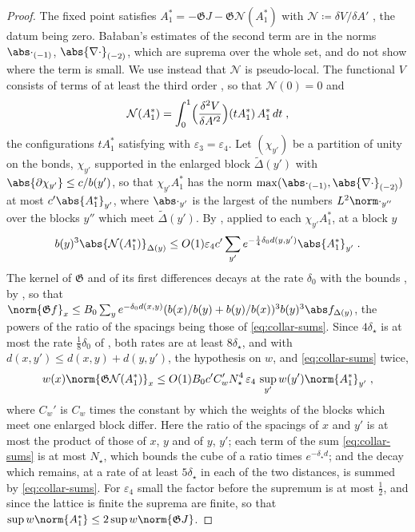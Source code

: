\begin{proof}
The fixed point satisfies $A_1^* = -\mathfrak GJ - \mathfrak G\mathcal N(A_1^*)$ with $\mathcal N \coloneqq \delta V/\delta A'$ \cite[(111)]{BalabanVAR}, the datum being zero. Ba{\l}aban's estimates of the second term \cite[(117), (120)]{BalabanVAR} are in the norms $\abs\cdot_{(-1)}$, $\abs{\nabla\cdot}_{(-2)}$, which are suprema over the whole set, and do not show where the term is small. We use instead that $\mathcal N$ is pseudo-local. The functional $V$ consists of terms of at least the third order \cite[(80)]{BalabanVAR}, so that $\mathcal N(0) = 0$ and
\[
    \mathcal N(A_1^*) = \int_0^1\Bigl(\frac{\delta^2V}{\delta A'^2}\Bigr)(tA_1^*)\,A_1^*\,dt\;,
\]
the configurations $tA_1^*$ satisfying \cite[(77)]{BalabanVAR} with $\varepsilon_3 = \varepsilon_4$. Let $(\chi_{y'})$ be a partition of unity on the bonds, $\chi_{y'}$ supported in the enlarged block $\tilde\Delta(y')$ with $\abs{\partial\chi_{y'}} \leq c/b(y')$, so that $\chi_{y'}A_1^*$ has the norm $\max(\abs\cdot_{(-1)}, \abs{\nabla\cdot}_{(-2)})$ at most $c'\abs{A_1^*}_{y'}$, where $\abs\cdot_{y'}$ is the largest of the numbers $L^2\norm\cdot_{y''}$ over the blocks $y''$ which meet $\tilde\Delta(y')$. By \cite[(189), p.~308]{BalabanVAR}, applied to each $\chi_{y'}A_1^*$, at a block $y$
\[
    b(y)^3\abs{\mathcal N(A_1^*)}_{\Delta(y)} \leq O(1)\varepsilon_4c'\sum_{y'}e^{-\frac{1}{4}\delta_0d(y,y')}\abs{A_1^*}_{y'}\;.
\]
The kernel of $\mathfrak G$ and of its first differences decays at the rate $\delta_0$ with the bounds \cite[(3.42)--(3.44)]{BalabanPBG}, by \cite[Theorem~3.13]{BalabanPBG}, so that $\norm{\mathfrak Gf}_x \leq B_0\sum_ye^{-\delta_0d(x,y)}(b(x)/b(y) + b(y)/b(x))^3b(y)^3\abs f_{\Delta(y)}$, the powers of the ratio of the spacings being those of \eqref{eq:collar-sums}. Since $4\delta_\star$ is at most the rate $\frac{1}{8}\delta_0$ of \cite[(190)]{BalabanVAR}, both rates are at least $8\delta_\star$, and with $d(x, y') \leq d(x, y) + d(y, y')$, the hypothesis on $w$, and \eqref{eq:collar-sums} twice,
\[
    w(x)\norm{\mathfrak G\mathcal N(A_1^*)}_x \leq O(1)B_0c'C_w'N_\star^4\,\varepsilon_4\,\sup_{y'}w(y')\norm{A_1^*}_{y'}\;,
\]
where $C_w'$ is $C_w$ times the constant by which the weights of the blocks which meet one enlarged block differ. Here the ratio of the spacings of $x$ and $y'$ is at most the product of those of $x$, $y$ and of $y$, $y'$; each term of the sum \eqref{eq:collar-sums} is at most $N_\star$, which bounds the cube of a ratio times $e^{-\delta_\star d}$; and the decay which remains, at a rate of at least $5\delta_\star$ in each of the two distances, is summed by \eqref{eq:collar-sums}. For $\varepsilon_4$ small the factor before the supremum is at most $\frac{1}{2}$, and since the lattice is finite the suprema are finite, so that $\sup w\norm{A_1^*} \leq 2\sup w\norm{\mathfrak GJ}$.


\end{proof}
